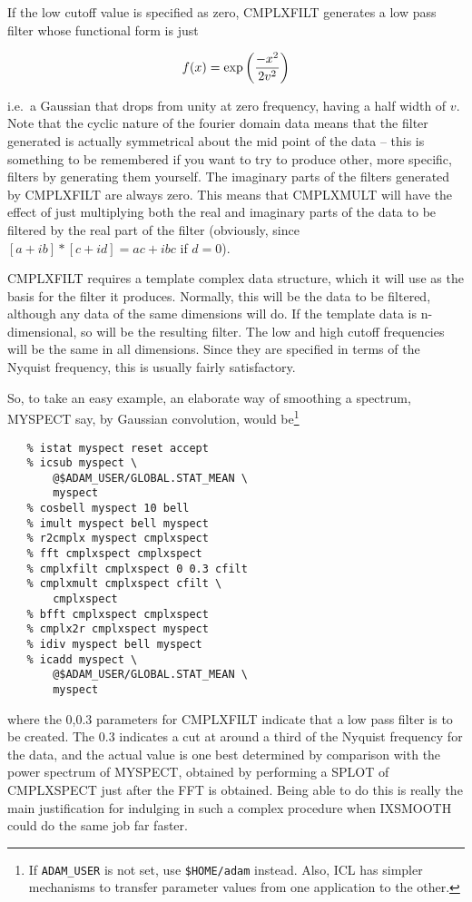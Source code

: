 If the low cutoff value is specified as zero, CMPLXFILT generates
a low pass filter whose functional form is just

$$f(x) = \exp{\left({{-x^2}\over{2 v^2}}\right)}$$

i.e.\ a Gaussian that drops from unity at zero frequency, having a half
width of $v$.  Note that the cyclic nature of the fourier domain data means
that the filter generated is actually symmetrical about the mid point of
the data -- this is something to be remembered if you want to try to
produce other, more specific, filters by generating them yourself.
The imaginary parts of the filters generated by CMPLXFILT are always
zero.  This means that CMPLXMULT will have the effect of just multiplying
both the real and imaginary parts of the data to be filtered by the real
part of the filter (obviously, since $[a+ib]*[c+id] = ac+ibc$ if $d=0$).

CMPLXFILT requires a template complex data structure, which it will
use as the basis for the filter it produces.  Normally, this will be the
data to be filtered, although any data of the same dimensions will do.
If the template data is n-dimensional, so will be the resulting filter.  The
low and high cutoff frequencies will be the same in all dimensions.  Since
they are specified in terms of the Nyquist frequency, this is usually
fairly satisfactory.

So, to take an easy example, an elaborate way of smoothing a spectrum,
MYSPECT say, by Gaussian convolution, would be\footnote{
   If {\tt ADAM\_USER} is not set, use {\tt \$HOME/adam} instead.  Also,
   ICL has simpler mechanisms to transfer parameter values from one
   application to the other.}

\begin{verbatim}
   % istat myspect reset accept
   % icsub myspect \
       @$ADAM_USER/GLOBAL.STAT_MEAN \
       myspect
   % cosbell myspect 10 bell
   % imult myspect bell myspect
   % r2cmplx myspect cmplxspect
   % fft cmplxspect cmplxspect
   % cmplxfilt cmplxspect 0 0.3 cfilt
   % cmplxmult cmplxspect cfilt \
       cmplxspect
   % bfft cmplxspect cmplxspect
   % cmplx2r cmplxspect myspect
   % idiv myspect bell myspect
   % icadd myspect \
       @$ADAM_USER/GLOBAL.STAT_MEAN \
       myspect
\end{verbatim}

where the 0,0.3 parameters for CMPLXFILT indicate that a low pass filter 
is to be created.  The 0.3 indicates a cut at around a third of the Nyquist
frequency for the data,
and the actual value is one best determined by comparison with the power
spectrum of MYSPECT, obtained by performing a SPLOT of CMPLXSPECT just after
the FFT is obtained.  Being able to do this is really the main justification
for indulging in such a complex procedure when IXSMOOTH could do the same
job far faster.

